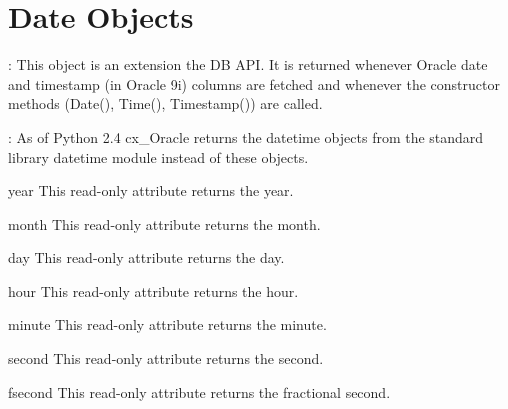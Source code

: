 \documentclass{manual}
\begin{document}
\chapter{Date Objects\label{dateobj}}

: This object is an extension the DB API. It is returned whenever
Oracle date and timestamp (in Oracle 9i) columns are fetched and whenever the
constructor methods (Date(), Time(), Timestamp()) are called.

: As of Python 2.4 cx_Oracle returns the datetime objects from the
standard library datetime module instead of these objects.

\begin{datadesc}{year}
  This read-only attribute returns the year.
\end{datadesc}

\begin{datadesc}{month}
  This read-only attribute returns the month.
\end{datadesc}

\begin{datadesc}{day}
  This read-only attribute returns the day.
\end{datadesc}

\begin{datadesc}{hour}
  This read-only attribute returns the hour.
\end{datadesc}

\begin{datadesc}{minute}
  This read-only attribute returns the minute.
\end{datadesc}

\begin{datadesc}{second}
  This read-only attribute returns the second.
\end{datadesc}

\begin{datadesc}{fsecond}
  This read-only attribute returns the fractional second.
\end{datadesc}


\end{document}
